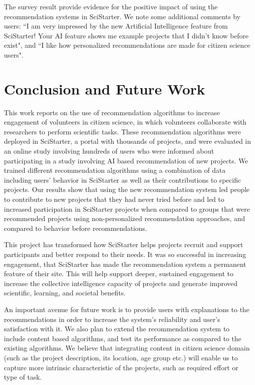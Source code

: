 \documentclass[letterpaper]{article} %
\begin{document}
The survey  result provide evidence for the positive impact of using the recommendation systems in  SciStarter. We note some additional comments by users: ``I am very impressed by the new Artificial Intelligence feature from SciStarter! Your AI feature shows me example projects that I didn't know before exist", and ``I like how personalized recommendations are made for citizen science users".



\section{Conclusion and Future Work}


This work reports on the use of recommendation algorithms to increase engagement of volunteers in citizen science, in which volunteers collaborate with researchers to perform scientific tasks.
These recommendation algorithms were deployed in   SciStarter, a portal with thousands of  projects,  and were evaluated in an online study involving hundreds of users who were informed about participating in a study involving AI based recommendation of new projects.
 We trained different recommendation algorithms using a combination of data including   users' behavior in SciStarter as well as their contributions to specific projects.  Our results show that using the new recommendation system  led people to contribute to  new projects that they had never tried before and  led to increased participation in SciStarter projects when compared to groups that were
recommended projects using non-personalized recommendation
approaches, and compared to behavior before recommendations.


 This project has transformed how SciStarter helps projects recruit and support participants and better respond to their needs. It was so successful in increasing engagement, that SciStarter has made the recommendation system a permanent feature of their site. This will help support deeper, sustained engagement to increase the collective intelligence capacity of projects and generate improved scientific, learning, and societal benefits.
%

An important avenue for future work is to provide
users with explanations   to the recommendations in order to increase the system's reliability and user's satisfaction with it.  We also  plan to extend the recommendation system to include content based algorithms, and test its performance as compared to the existing algorithms. We believe that integrating content in citizen science domain (such as the project description, its location, age group etc.)  will enable us to
 capture more intrinsic characteristic of the projects, such as required effort or type of task.
\end{document}
